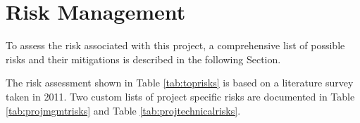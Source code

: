 \section{Risk Management}


To assess the risk associated with this project, a comprehensive list of possible risks and their mitigations is described in the following Section. 

The risk assessment shown in Table \ref{tab:toprisks} is based on a literature survey\cite{arnuphaptrairong2011top} taken in 2011. Two custom lists of project specific risks are documented in Table \ref{tab:projmgmtrisks} and Table \ref{tab:projtechnicalrisks}.

